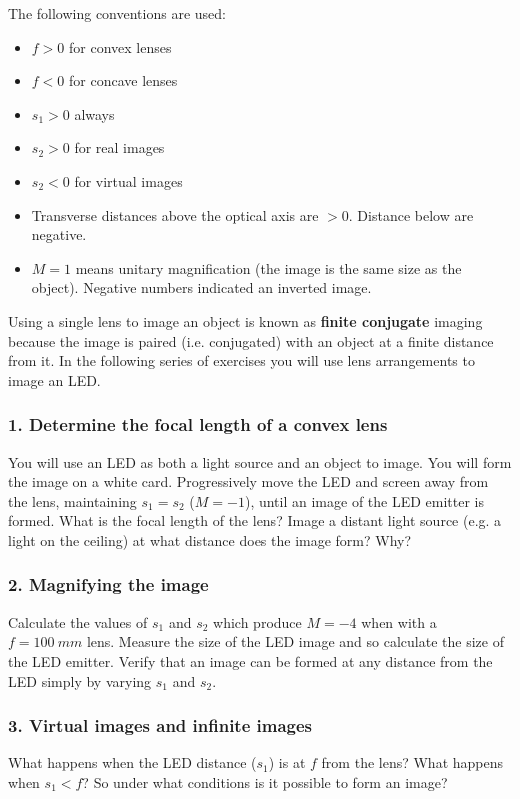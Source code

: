 \documentclass[a4paper]{report}
\begin{document}
The following conventions are used:
\begin{itemize}
\item $f>0$ for convex lenses
\item $f<0$ for concave lenses
\item $s_1>0$ always
\item $s_2>0$ for real images
\item $s_2<0$ for virtual images
\item Transverse distances above the optical axis are $>0$. Distance
  below are negative. 
\item $M=1$ means unitary magnification (the image is the same size as
  the object). Negative numbers indicated an inverted image.
\end{itemize}

Using a single lens to image an object is known as \textbf{finite
  conjugate} imaging because the image is paired (i.e. conjugated)
with an object at a finite distance from it. In the following series
of exercises you will use lens arrangements to image an LED.

\subsubsection{1. Determine the focal length of a convex lens }
You will use an LED as both a light source and an object to image. You
will form the image on a white card. Progressively move the LED and
screen away from the lens, maintaining $s_1=s_2$ ($M=-1$), until an
image of the LED emitter is formed. What is the focal length of the
lens? Image a distant light source (e.g. a light on the ceiling) at
what distance does the image form? Why?

% 
\subsubsection{2. Magnifying the image}
Calculate the values of $s_1$ and $s_2$ which produce $M=-4$ when with
a $f=100~mm$ lens. Measure the size of the LED image and so calculate
the size of the LED emitter. Verify that an image can be formed at any
distance from the LED simply by varying $s_1$ and $s_2$. 

\subsubsection{3. Virtual images and infinite images}
What happens when the LED distance ($s_1$) is at $f$ from the lens?
What happens when $s_1<f$? So under what conditions is it possible to
form an image?
\end{document}
